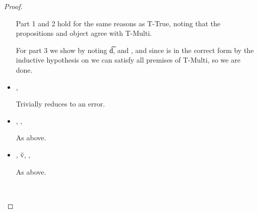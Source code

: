 \begin{lemma}
\begin{proof}
\begin{case}[T-DefMethod]
\begin{itemize}
\begin{subcase}[B-DefMethod]
                                Part 1 and 2 hold for the same reasons as T-True, noting that the propositions
                                and object agree with T-Multi.

For part 3 we show
by noting \judgementtwo {} { {\t{d}}},
  and
  , and since \disptable{} is in the correct form by the inductive
  hypothesis on {} we can satisfy all premises of T-Multi, so we are done.


      \end{subcase}

    \item[]
      \begin{subcase}[BE-DefMethod1]
        \opsem {\openv{}}
               {}
               {\errorval{\v{}}},
        \opsem {\openv{}}
                  {\e{}}
                {\errorval{\v{}}}

                Trivially reduces to an error.

      \end{subcase}
    \item[]
      \begin{subcase}[BE-DefMethod2]
        \opsem {\openv{}}
         {}
         { {\disptable{}}},
  \opsem {\openv{}}
         {}
         {\errorval{\v{}}},
        \opsem {\openv{}}
                  {\e{}}
                {\errorval{\v{}}}

                As above.
      \end{subcase}
    \item[]
      \begin{subcase}[BE-DefMethod3]
        \opsem {\openv{}}
         {}
         { {\disptable{}}},
  \opsem {\openv{}}
         {}
         {\v{v}},
  \opsem {\openv{}}
         {}
         {\errorval{\v{}}},
        \opsem {\openv{}}
                  {\e{}}
                {\errorval{\v{}}}

                As above.

      \end{subcase}
  \end{itemize}
\end{case}

\begin{case}[T-App]
  \ 


\end{case}
\end{proof}
\end{lemma}
